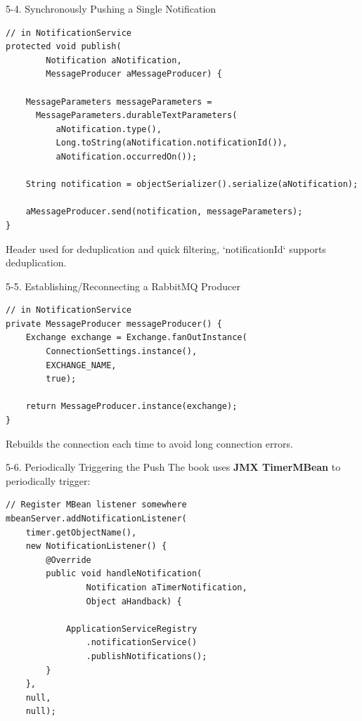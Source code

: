 \documentclass{beamer}
\begin{document}
\begin{frame}[fragile]{5-4. Synchronously Pushing a Single Notification}
  \lstset{language=Java, basicstyle=\ttfamily\scriptsize}
  \begin{lstlisting}
// in NotificationService
protected void publish(
        Notification aNotification,
        MessageProducer aMessageProducer) {

    MessageParameters messageParameters =
      MessageParameters.durableTextParameters(
          aNotification.type(),
          Long.toString(aNotification.notificationId()),
          aNotification.occurredOn());

    String notification = objectSerializer().serialize(aNotification);

    aMessageProducer.send(notification, messageParameters);
}
  \end{lstlisting}
  Header used for deduplication and quick filtering, `notificationId` supports deduplication.
\end{frame}

\begin{frame}[fragile]{5-5. Establishing/Reconnecting a RabbitMQ Producer}
  \lstset{language=Java, basicstyle=\ttfamily\scriptsize}
  \begin{lstlisting}
// in NotificationService
private MessageProducer messageProducer() {
    Exchange exchange = Exchange.fanOutInstance(
        ConnectionSettings.instance(),
        EXCHANGE_NAME,
        true);

    return MessageProducer.instance(exchange);
}
  \end{lstlisting}
  Rebuilds the connection each time to avoid long connection errors.
\end{frame}

\begin{frame}[fragile]{5-6. Periodically Triggering the Push}
  The book uses \textbf{JMX TimerMBean} to periodically trigger:
  \lstset{language=Java, basicstyle=\ttfamily\tiny}
  \begin{lstlisting}
// Register MBean listener somewhere
mbeanServer.addNotificationListener(
    timer.getObjectName(),
    new NotificationListener() {
        @Override
        public void handleNotification(
                Notification aTimerNotification,
                Object aHandback) {

            ApplicationServiceRegistry
                .notificationService()
                .publishNotifications();
        }
    },
    null,
    null);
  \end{lstlisting}
\end{frame}
\end{document}
